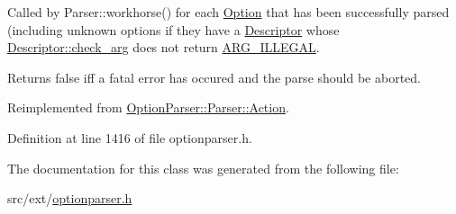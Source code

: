 Called by Parser\-::workhorse() for each \hyperlink{class_option_parser_1_1_option}{Option} that has been successfully parsed (including unknown options if they have a \hyperlink{struct_option_parser_1_1_descriptor}{Descriptor} whose \hyperlink{struct_option_parser_1_1_descriptor_aac19c7bd3a84282211edd0331c92a44a}{Descriptor\-::check\-\_\-arg} does not return \hyperlink{namespace_option_parser_ad237d47d58c66dea8dcf4f53ac11a6e4a6ea016ff6334ed0d2ec885e96a76c472}{A\-R\-G\-\_\-\-I\-L\-L\-E\-G\-A\-L}. 

Returns {\ttfamily false} iff a fatal error has occured and the parse should be aborted. 

Reimplemented from \hyperlink{struct_option_parser_1_1_parser_1_1_action_a04eafe7666fd69e0a84a0aac118ccb8a}{Option\-Parser\-::\-Parser\-::\-Action}.



Definition at line 1416 of file optionparser.\-h.



The documentation for this class was generated from the following file\-:\begin{DoxyCompactItemize}
\item 
src/ext/\hyperlink{optionparser_8h}{optionparser.\-h}\end{DoxyCompactItemize}
